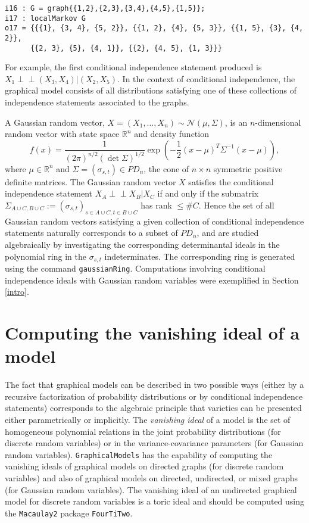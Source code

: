 \documentclass[letterpaper]{article}
\theoremstyle{plain}
\theoremstyle{definition}
\def\ci{\perp\!\!\!\perp}
\begin{document}
\begin{verbatim}
i16 : G = graph{{1,2},{2,3},{3,4},{4,5},{1,5}};
i17 : localMarkov G
o17 = {{{1}, {3, 4}, {5, 2}}, {{1, 2}, {4}, {5, 3}}, {{1, 5}, {3}, {4, 2}}, 
      {{2, 3}, {5}, {4, 1}}, {{2}, {4, 5}, {1, 3}}}
\end{verbatim}

For example, the first conditional independence statement produced
is $X_{1} \ci (X_{3}, X_{4}) | (X_{2}, X_{5})$.  In the 
context of conditional independence, the graphical model
consists of all distributions satisfying one of these collections
of independence statements associated to the graphs.

A Gaussian random vector, $X = (X_{1}, \ldots, X_{n}) 
\sim \mathcal{N}(\mu, \Sigma)$, is an
$n$-dimensional random vector with state space $\mathbb{R}^{n}$ and
density function
$$
f(x)  =  \frac{1}{(2 \pi)^{n/2}(\det \Sigma)^{1/2} } 
\exp\left( - \frac{1}{2} (x- \mu)^{T} \Sigma^{{-1}} (x - \mu) \right), 
$$
where $\mu \in \mathbb{R}^{n}$ and $\Sigma = (\sigma_{s,t}) \in PD_{n}$, the cone of 
$n \!\times\! n$ symmetric positive definite matrices.  The Gaussian random vector
$X$ satisfies the conditional independence statement $X_{A} \ci X_{B} | X_{C}$
if and only if the submatrix 
$\Sigma_{A \cup C, B \cup C}  := 
(\sigma_{s,t})_{s \in A \cup C, t \in B \cup C}$ has rank $\leq \#C$.
Hence the set of all Gaussian random vectors satisfying a given
collection of conditional independence statements naturally corresponds
to a subset of $PD_{n}$, and are studied algebraically by investigating  the 
corresponding determinantal ideals in the polynomial ring
in the $\sigma_{s,t}$ indeterminates.  The corresponding ring
is generated using the command {\tt gaussianRing}.
Computations involving conditional independence ideals with
Gaussian random variables were exemplified in Section \ref{intro}. 



\section{Computing the vanishing ideal of a model}

The fact that graphical models can be described in two possible ways (either by a recursive
factorization of probability distributions or by conditional independence
statements) corresponds to the algebraic principle that varieties can be presented either
parametrically or implicitly. The \emph{vanishing ideal} of a model is the set
of homogeneous polynomial relations in the joint probability distributions (for discrete
random variables) or in the variance-covariance parameters (for Gaussian
random variables).
{\tt GraphicalModels} has the capability of computing the vanishing ideals
of graphical models on directed graphs (for discrete random variables) and also
of graphical models on directed, undirected, or  mixed
graphs (for Gaussian random variables).  The vanishing ideal
of an undirected graphical model for discrete random variables is
a toric ideal and
should be computed using the {\tt Macaulay2} package {\tt FourTiTwo}.
\end{document}
